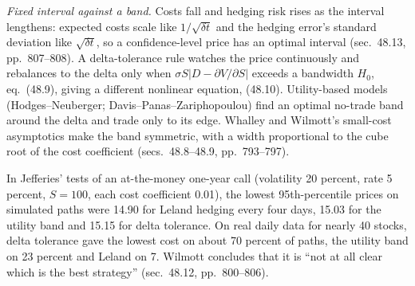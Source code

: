 \begin{qfmethod}
 \emph{Fixed interval against a band.} Costs fall and hedging risk rises as the interval lengthens: expected costs scale like $1/\sqrt{\delta t}$ and the hedging error's standard deviation like $\sqrt{\delta t}$, so a confidence-level price has an optimal interval (sec.~48.13, pp.~807--808). A delta-tolerance rule watches the price continuously and rebalances to the delta only when $\sigma S|D-\partial V/\partial S|$ exceeds a bandwidth $H_0$, eq.~(48.9), giving a different nonlinear equation, (48.10). Utility-based models (Hodges--Neuberger; Davis--Panas--Zariphopoulou) find an optimal no-trade band around the delta and trade only to its edge. Whalley and Wilmott's small-cost asymptotics make the band symmetric, with a width proportional to the cube root of the cost coefficient (secs.~48.8--48.9, pp.~793--797).

In Jefferies' tests of an at-the-money one-year call (volatility 20 percent, rate 5 percent, $S=100$, each cost coefficient 0.01), the lowest 95th-percentile prices on simulated paths were 14.90 for Leland hedging every four days, 15.03 for the utility band and 15.15 for delta tolerance. On real daily data for nearly 40 stocks, delta tolerance gave the lowest cost on about 70 percent of paths, the utility band on 23 percent and Leland on 7. Wilmott concludes that it is ``not at all clear which is the best strategy'' (sec.~48.12, pp.~800--806).


\end{qfmethod}
